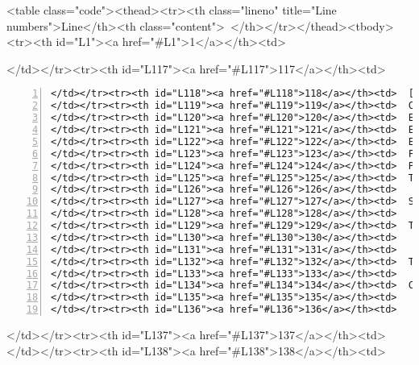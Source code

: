 <table class="code"><thead><tr><th class="lineno" title="Line numbers">Line</th><th class="content"> </th></tr></thead><tbody><tr><th id="L1"><a href="#L1">1</a></th><td>\documentclass[a4paper,11pt]{article}
\begin{document}
</td></tr><tr><th id="L117"><a href="#L117">117</a></th><td>\begin{lstlisting}[language=Oberon,frame=none,numbers=left]
</td></tr><tr><th id="L118"><a href="#L118">118</a></th><td>  [1] TRAP 8 PL 3 8  ASSERT failed WinAos Revision 2081 (19.02.2009)
</td></tr><tr><th id="L119"><a href="#L119">119</a></th><td>  CS:=00000023 DS:=0000002B ES:=0000002B SS:=0000002B PC=0ECA7F92
</td></tr><tr><th id="L120"><a href="#L120">120</a></th><td>  ESI=0CCB679A EDI=05FBFF46 ESP=05FBFF20 PID=000017A8
</td></tr><tr><th id="L121"><a href="#L121">121</a></th><td>  EAX=00000000 EBX=00000000 ECX=75443D09 EDX=00000000 
</td></tr><tr><th id="L122"><a href="#L122">122</a></th><td>  EBP=05FBFF28 FS:=00000053 GS:=0000002B TMR=00A97689
</td></tr><tr><th id="L123"><a href="#L123">123</a></th><td>  FLAGS: cPaZstIdo iopl0 {1..2, 6, 9}
</td></tr><tr><th id="L124"><a href="#L124">124</a></th><td>  Process: 6056 run 0 20ECE9BF0:Commands.Runner NIL {0, 28}
</td></tr><tr><th id="L125"><a href="#L125">125</a></th><td>  TrapDemo.Proc2 pc=34 [00000022H]
</td></tr><tr><th id="L126"><a href="#L126">126</a></th><td>    string=00000000H (NIL)
</td></tr><tr><th id="L127"><a href="#L127">127</a></th><td>  State TrapDemo:
</td></tr><tr><th id="L128"><a href="#L128">128</a></th><td>    @Self=0ECE9950H (Modules.Module)
</td></tr><tr><th id="L129"><a href="#L129">129</a></th><td>  TrapDemo.Proc1 pc=65 [00000041H]
</td></tr><tr><th id="L130"><a href="#L130">130</a></th><td>    a=99 (00000063H)
</td></tr><tr><th id="L131"><a href="#L131">131</a></th><td>    b=11 (0000000BH)
</td></tr><tr><th id="L132"><a href="#L132">132</a></th><td>  TrapDemo.Demo pc=95 [0000005FH]
</td></tr><tr><th id="L133"><a href="#L133">133</a></th><td>    string="Demo!"
</td></tr><tr><th id="L134"><a href="#L134">134</a></th><td>  Commands.Runner.@Body pc=1042 [00000412H]
</td></tr><tr><th id="L135"><a href="#L135">135</a></th><td>    @Self=0ECE9BF0H (Commands.Runner)
</td></tr><tr><th id="L136"><a href="#L136">136</a></th><td>\end{lstlisting}
</td></tr><tr><th id="L137"><a href="#L137">137</a></th><td>
</td></tr><tr><th id="L138"><a href="#L138">138</a></th><td>
\end{document}
